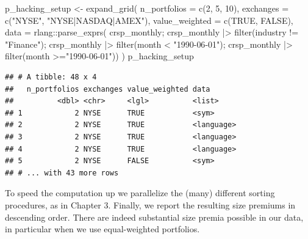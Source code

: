 \documentclass[
]{book}
\newenvironment{Shaded}{\begin{snugshade}}{\end{snugshade}}
\newcommand{\AttributeTok}[1]{\textcolor[rgb]{0.61,0.61,0.61}{#1}}
\newcommand{\ConstantTok}[1]{\textcolor[rgb]{0,0,0}{#1}}
\newcommand{\DecValTok}[1]{\textcolor[rgb]{0.06,0.06,0.06}{#1}}
\newcommand{\FunctionTok}[1]{\textcolor[rgb]{0,0,0}{#1}}
\newcommand{\NormalTok}[1]{#1}
\newcommand{\OtherTok}[1]{\textcolor[rgb]{0.37,0.37,0.37}{#1}}
\newcommand{\SpecialCharTok}[1]{\textcolor[rgb]{0,0,0}{#1}}
\newcommand{\StringTok}[1]{\textcolor[rgb]{0.5,0.5,0.5}{#1}}
\begin{document}
\begin{Shaded}
\begin{Highlighting}[]
\NormalTok{p\_hacking\_setup }\OtherTok{\textless{}{-}} \FunctionTok{expand\_grid}\NormalTok{(}
  \AttributeTok{n\_portfolios =} \FunctionTok{c}\NormalTok{(}\DecValTok{2}\NormalTok{, }\DecValTok{5}\NormalTok{, }\DecValTok{10}\NormalTok{),}
  \AttributeTok{exchanges =} \FunctionTok{c}\NormalTok{(}\StringTok{"NYSE"}\NormalTok{, }\StringTok{"NYSE|NASDAQ|AMEX"}\NormalTok{),}
  \AttributeTok{value\_weighted =} \FunctionTok{c}\NormalTok{(}\ConstantTok{TRUE}\NormalTok{, }\ConstantTok{FALSE}\NormalTok{),}
  \AttributeTok{data =}\NormalTok{ rlang}\SpecialCharTok{::}\FunctionTok{parse\_exprs}\NormalTok{(}
  \StringTok{\textquotesingle{}crsp\_monthly; crsp\_monthly |\textgreater{} filter(industry != "Finance");}
\StringTok{   crsp\_monthly |\textgreater{} filter(month \textless{} "1990{-}06{-}01");}
\StringTok{   crsp\_monthly |\textgreater{} filter(month \textgreater{}="1990{-}06{-}01")\textquotesingle{}}\NormalTok{)}
\NormalTok{)}
\NormalTok{p\_hacking\_setup}
\end{Highlighting}
\end{Shaded}

\begin{verbatim}
## # A tibble: 48 x 4
##   n_portfolios exchanges value_weighted data      
##          <dbl> <chr>     <lgl>          <list>    
## 1            2 NYSE      TRUE           <sym>     
## 2            2 NYSE      TRUE           <language>
## 3            2 NYSE      TRUE           <language>
## 4            2 NYSE      TRUE           <language>
## 5            2 NYSE      FALSE          <sym>     
## # ... with 43 more rows
\end{verbatim}

To speed the computation up we parallelize the (many) different sorting procedures, as in Chapter 3. Finally, we report the resulting size premiums in descending order. There are indeed substantial size premia possible in our data, in particular when we use equal-weighted portfolios.
\end{document}
